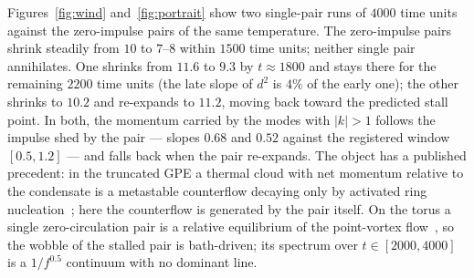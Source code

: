 \documentclass[11pt,a4paper]{article}
\begin{document}
Figures~\ref{fig:wind} and~\ref{fig:portrait} show two single-pair runs of $4000$ time units against the
zero-impulse pairs of the same temperature. The zero-impulse pairs shrink steadily from $10$ to $7$--$8$ within $1500$ time units; neither single
pair annihilates. One shrinks from $11.6$ to $9.3$ by $t\approx1800$ and stays there for the remaining $2200$ time
units (the late slope of $d^2$ is $4\%$ of the early one); the other shrinks to $10.2$ and re-expands to $11.2$,
moving back toward the predicted stall point. In both, the momentum carried by the modes with $|k|>1$ follows the
impulse shed by the pair --- slopes $0.68$ and $0.52$ against the registered window $[0.5,1.2]$ --- and falls back when
the pair re-expands. The object has a published precedent: in the truncated GPE a thermal cloud with net momentum
relative to the condensate is a metastable counterflow decaying only by activated ring
nucleation~\cite{KrstulovicBrachet2011}; here the counterflow is generated by the pair itself. On the torus a single
zero-circulation pair is a relative equilibrium of the point-vortex flow~\cite{ModinViviani2020}, so the wobble of the
stalled pair is bath-driven; its spectrum over $t\in[2000,4000]$ is a $1/f^{0.5}$ continuum with no dominant line.
\end{document}
